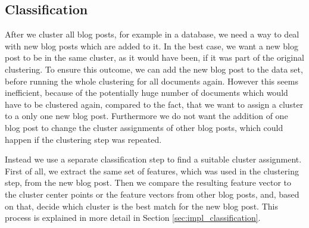 
\subsection{Classification}
\label{sec:classification}


After we cluster all blog posts, for example in a database, we need a way to deal with new blog posts which are added to it.
In the best case, we want a new blog post to be in the same cluster, as it would have been, if it was part of the original clustering.
To ensure this outcome, we can add the new blog post to the data set, before running the whole clustering for all documents again.
However this seems inefficient, because of the potentially huge number of documents which would have to be clustered again, compared to the fact, that we want to assign a cluster to a only one new blog post.
Furthermore we do not want the addition of one blog post to change the cluster assignments of other blog posts, which could happen if the clustering step was repeated.


Instead we use a separate classification step to find a suitable cluster assignment.
First of all, we extract the same set of features, which was used in the clustering step, from the new blog post.
Then we compare the resulting feature vector to the cluster center points or the feature vectors from other blog posts, and, based on that, decide which cluster is the best match for the new blog post.
This process is explained in more detail in Section \ref{sec:impl_classification}.